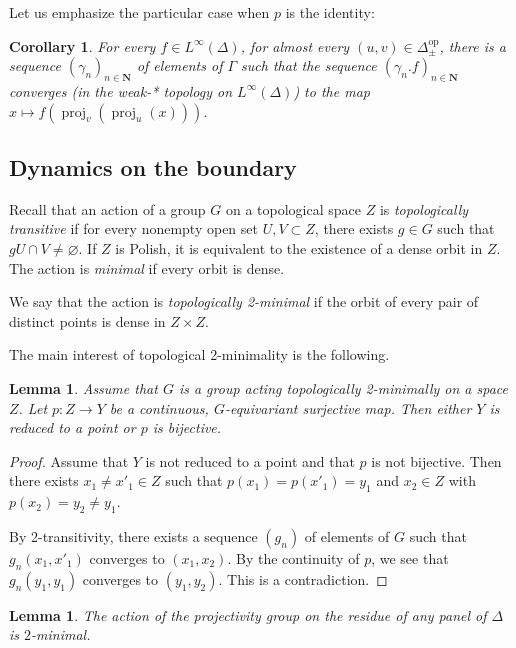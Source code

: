 \documentclass[a4paper, 11pt]{article}
\theoremstyle{plain}
\newtheorem{lemma}[proposition]{Lemma}
\newtheorem{corollary}[proposition]{Corollary}
\theoremstyle{definition}
\theoremstyle{remark}
\DeclareMathOperator{\proj}{proj}
\newcommand{\NN}{\mathbf{N}}                          %
\newcommand{\op}{\mathrm{op}}
\begin{document}
Let us emphasize the particular case when $p$ is the identity:

\begin{corollary}\label{cor:convTuv}
For every $f\in L^\infty(\Delta)$, for almost every $(u,v)\in \Delta_\pm^\op$, there is a sequence $(\gamma_n)_{n\in\NN}$ of elements of $\Gamma$ such that the sequence $(\gamma_n.f)_{n\in \NN}$ converges (in the weak-* topology on $L^\infty(\Delta)$) to the  map $x\mapsto  f(\proj_v(\proj_u(x)))$.
\end{corollary}



\subsection{Dynamics on the boundary}


 Recall that an action of a group $G$ on a topological space $Z$ is \emph{topologically transitive} if for every nonempty open set $U,V\subset Z$, there exists $g\in G$ such that $gU\cap V\neq\varnothing$. If $Z$ is Polish, it is equivalent to the existence of a dense orbit in $Z$. The action is \emph{minimal} if every orbit is dense.
 
 We say that the action is \emph{topologically 2-minimal} if the orbit of every pair of distinct points is dense in $Z\times Z$.

The main interest of topological 2-minimality is the following.


\begin{lemma}
Assume that $G$ is a group acting topologically 2-minimally on a space $Z$. Let $p:Z\to Y$ be a continuous, $G$-equivariant surjective map. Then either $Y$ is reduced to a point or $p$ is bijective.
\end{lemma}

\begin{proof}
Assume that $Y$ is not reduced to a point and that $p$ is not bijective. Then there exists $x_1\neq x'_1\in Z$ such that $p(x_1)=p(x'_1)=y_1$ and $x_2\in Z$ with $p(x_2)=y_2\neq y_1$.

By 2-transitivity, there exists a sequence $(g_n)$ of elements of $G$ such that $g_n(x_1,x'_1)$ converges to $(x_1,x_2)$. By the continuity of $p$, we see that $g_n (y_1,y_1)$ converges to $(y_1,y_2)$. This is a contradiction.
\end{proof}

\begin{lemma}\label{lem:projectivityis2minimal}
The action of the projectivity group on the residue of any panel of $\Delta$ is $2$-minimal.
\end{lemma}
\end{document}
